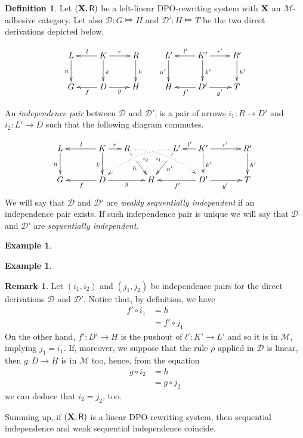 \documentclass[a4paper]{article}
\def\R{\mathsf{R}}
\def\X{\textbf {\textup{X}}}
\newcommand{\dder}[1]{\mathscr{#1}}
\theoremstyle{definition}
\newtheorem{definition}[theorem]{Definition}
\newtheorem{remark}[theorem]{Remark}
\newtheorem{example}[theorem]{Example}
\begin{document}
\begin{definition}  Let $(\X, \R)$ be a left-linear DPO-rewriting system with $\X$ an $\mathcal{M}$-adhesive category. Let also $\dder{D}\colon G\Mapsto H$ and $\dder{D'}\colon H\Mapsto T$ be the two direct derivations depicted below.
	
	\[\xymatrix{L \ar[d]_{n}& K \ar[d]^{k}\ar[l]_{l} \ar[r]^{r} & R \ar[d]^{h} & L' \ar[d]_{n'}& K' \ar[d]^{k'}\ar[l]_{l'} \ar[r]^{r'} & R' \ar[d]^{h'}\\G & \ar[l]^{f} D \ar[r]_{g}& H & H & \ar[l]^{f'} D' \ar[r]_{g'}& T}\]
	
	An \emph{independence pair} between $\dder{D}$ and $\dder{D'}$, is a pair of  arrows $i_1\colon R\to D'$ and $i_2\colon L'\to D$ such that the following diagram commutes.
	
	\[\xymatrix@C=15pt{L \ar[d]_{n}&& K \ar[d]_{k}\ar[ll]_{l} \ar[r]^{r} & R \ar@/^.35cm/@{.>}[drrr]|(.3)\hole_(.4){i_1} \ar[dr]|(.3)\hole_{h} && L' \ar@/_.35cm/@{.>}[dlll]^(.4){i_2} \ar[dl]|(.3)\hole^{n'}& K' \ar[d]^{k'}\ar[l]_{l'} \ar[rr]^{r'} && R' \ar[d]^{h'}\\G && \ar[ll]^{f} D \ar[rr]_{g}&& H  && \ar[ll]^{f'} D' \ar[rr]_{g'}&& T}\]
	We will say that $\dder{D}$ and $\dder{D'}$ are \emph{weakly sequentially independent} if an independence pair exists. If such independence pair is unique we will say that $\dder{D}$ and $\dder{D'}$ are \emph{sequentially independent}.
\end{definition}

\begin{example}
\end{example}
\begin{example}
\end{example}

\begin{remark}\label{rem:weak} Let $(i_1, i_2)$ and $(j_1, j_2)$ be independence pairs for the direct derivations $\dder{D}$ and $\dder{D'}$. Notice that, by definition, we have
	\begin{align*}f'\circ i_1&=h\\&=f'\circ j_1
	\end{align*}
	On the other hand, 
	$f'\colon D'\to H$ is  the pushout of $l'\colon K'\to L'$ and so it is in $\mathcal{M}$, implying $j_1=i_1$. If, moreover, we suppose that the rule $\rho$ applied in $\dder{D}$ is linear, then $g\colon D\to H$ is in $\mathcal{M}$ too, hence, from the equation
	\begin{align*}
		g\circ i_2&=h \\&= g\circ j_2
	\end{align*}
	we can deduce that $i_2=j_2$, too.
	
	Summing up, if $(\X, \R)$ is a linear DPO-rewriting system, then sequential independence and weak sequential independence coincide. 
\end{remark}
\end{document}
